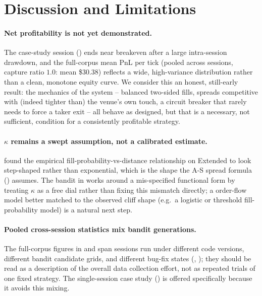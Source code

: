 \documentclass[11pt,a4paper]{article}
\begin{document}
\section{Discussion and Limitations}
\label{sec:limitations}

\paragraph{Net profitability is not yet demonstrated.} The case-study session ()
ends near breakeven after a large intra-session drawdown, and the full-corpus mean PnL per tick
(pooled across sessions, capture ratio $1.0$: mean \$30.38) reflects a wide, high-variance
distribution rather than a clean, monotone equity curve. We consider this an honest, still-early
result: the mechanics of the system -- balanced two-sided fills, spreads competitive with (indeed
tighter than) the venue's own touch, a circuit breaker that rarely needs to force a taker exit --
all behave as designed, but that is a necessary, not sufficient, condition for a consistently
profitable strategy.

\paragraph{$\kappa$ remains a swept assumption, not a calibrated estimate.} 
found the empirical fill-probability-vs-distance relationship on Extended to look step-shaped
rather than exponential, which is the shape the A-S spread formula () assumes.
The bandit in  works around a mis-specified functional form by treating $\kappa$
as a free dial rather than fixing this mismatch directly; a order-flow model better matched to the
observed cliff shape (e.g.\ a logistic or threshold fill-probability model) is a natural next
step.

\paragraph{Pooled cross-session statistics mix bandit generations.} The full-corpus figures in
 and  span sessions run under different code versions,
different bandit candidate grids, and different bug-fix states (,
); they should be read as a description of the overall data
collection effort, not as repeated trials of one fixed strategy. The single-session case study
() is offered specifically because it avoids this mixing.
\end{document}
